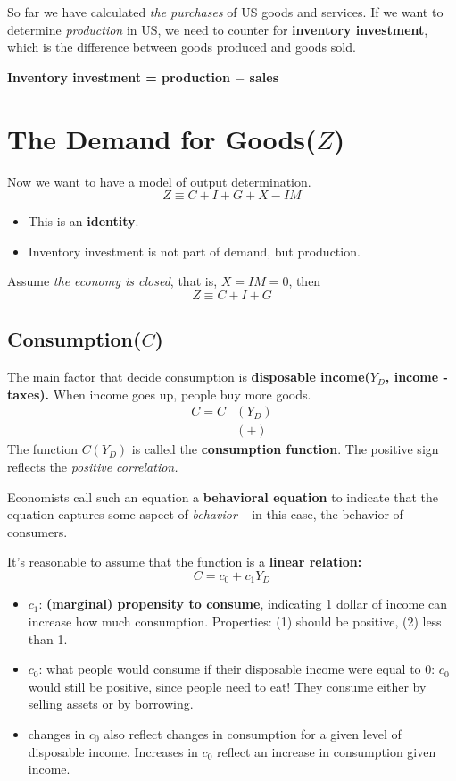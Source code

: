 \documentclass[11pt, a4paper]{ECON2123}
\begin{document}
\begin{spacing}{1.5}
    So far we have calculated {\it the purchases} of US goods 
    and services. If we want to determine {\it production} in US,
    we need to counter for {\bf inventory investment}, which 
    is the difference between goods produced and goods sold.
    \begin{center}
        {\bf Inventory investment = production $-$ sales}
    \end{center}

    \section{The Demand for Goods($Z$)}

    Now we want to have a model of output determination.
    $$Z\equiv C+I+G+X-IM$$
    \begin{itemize}
        \item This is an {\bf identity}.
        \item Inventory investment is not part of demand, but production.
    \end{itemize}

    Assume {\it the economy is closed}, that is, $X=IM=0$, then
    $$Z\equiv C+I+G$$

    \subsection{Consumption($C$)}

    The main factor that decide consumption is 
    {\bf disposable income($Y_D$, income - taxes).} When income goes up,
    people buy more goods.
    \begin{align*}
        C=C&(Y_D)\\
        &(+)
    \end{align*}
    The function $C(Y_D)$ is called the {\bf consumption function}.
    The positive sign reflects the {\it positive correlation.}

    Economists call such an equation a {\bf behavioral equation} 
    to indicate that the equation captures some aspect of 
    {\it behavior} -- in this case, the behavior of consumers.

    It's reasonable to assume that the function is a {\bf linear relation:}
    $$C=c_0+c_1Y_D$$
    \begin{itemize}
        \item $c_1$: {\bf (marginal) propensity to consume}, indicating 
        1 dollar of income can increase how much consumption. 
        Properties: (1) should be positive, (2) less than 1.
        \item $c_0$: what people would consume if their disposable 
        income were equal to 0: $c_0$ would still be positive, since 
        people need to eat! They consume either by selling assets or 
        by borrowing.
        \item changes in $c_0$ also reflect changes in consumption for 
        a given level of disposable income. Increases in $c_0$ reflect
        an increase in consumption given income.
    \end{itemize}


\end{spacing}
\end{document}
